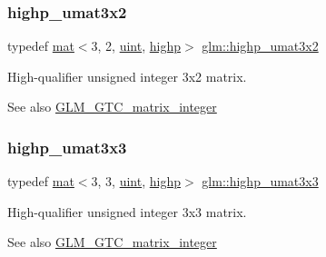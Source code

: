 \subsubsection{\texorpdfstring{highp\+\_\+umat3x2}{highp\_umat3x2}}
{\footnotesize\ttfamily typedef \hyperlink{structglm_1_1mat}{mat}$<$3, 2, \hyperlink{group__core__precision_ga4fd29415871152bfb5abd588334147c8}{uint}, \hyperlink{namespaceglm_a36ed105b07c7746804d7fdc7cc90ff25ac6f7eab42eacbb10d59a58e95e362074}{highp}$>$ \hyperlink{group__gtc__matrix__integer_ga91ed05f00d470b2448e024af7e244f49}{glm\+::highp\+\_\+umat3x2}}

High-\/qualifier unsigned integer 3x2 matrix. \begin{DoxySeeAlso}{See also}
\hyperlink{group__gtc__matrix__integer}{G\+L\+M\+\_\+\+G\+T\+C\+\_\+matrix\+\_\+integer} 
\end{DoxySeeAlso}
\mbox{\label{group__gtc__matrix__integer_gaa389f5f7427d2578424ddc12ce120af3}} 
\subsubsection{\texorpdfstring{highp\+\_\+umat3x3}{highp\_umat3x3}}
{\footnotesize\ttfamily typedef \hyperlink{structglm_1_1mat}{mat}$<$3, 3, \hyperlink{group__core__precision_ga4fd29415871152bfb5abd588334147c8}{uint}, \hyperlink{namespaceglm_a36ed105b07c7746804d7fdc7cc90ff25ac6f7eab42eacbb10d59a58e95e362074}{highp}$>$ \hyperlink{group__gtc__matrix__integer_gaa389f5f7427d2578424ddc12ce120af3}{glm\+::highp\+\_\+umat3x3}}

High-\/qualifier unsigned integer 3x3 matrix. \begin{DoxySeeAlso}{See also}
\hyperlink{group__gtc__matrix__integer}{G\+L\+M\+\_\+\+G\+T\+C\+\_\+matrix\+\_\+integer} 
\end{DoxySeeAlso}
\mbox{\label{group__gtc__matrix__integer_ga6df8a72a571bcd26ade637bf069b5562}} 
